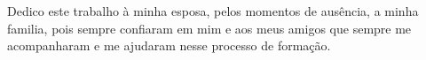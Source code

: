 
\begin{dedicatoria}%


Dedico este trabalho à minha esposa, pelos momentos de ausência, a minha familia, pois sempre confiaram em mim e aos meus amigos que sempre me acompanharam e me ajudaram nesse processo de formação.

\end{dedicatoria}
